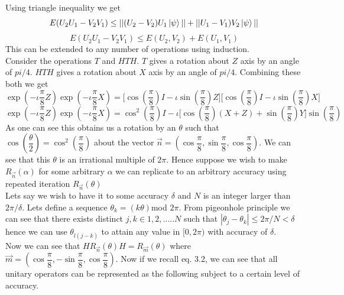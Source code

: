 \documentclass{report}
\begin{document}
Using triangle inequality we get
\begin{equation}E(U_{2}U_{1} - V_{2}V_{1}) \leq ||(U_{2} - V_{2})U_{1}\ket{\psi}|| + ||U_{1} - V_{1})V_{2}\ket{\psi}||\end{equation}
\begin{equation}E(U_{2}U_{1} - V_{2}V_{1}) \leq E(U_2,V_2) + E(U_1,V_1)\end{equation}
This can be extended to any number of operations using induction.\\
Consider the operations $T$ and $HTH$. $T$ gives a rotation about $Z$ axis by an angle of $pi/4$. $HTH$ gives a rotation about $X$ axis by an angle of $pi/4$. Combining these both we get
\begin{equation}
\exp(-\iota\dfrac{\pi}{8}Z)\exp(-\iota\dfrac{\pi}{8}X) = \Big[\cos\left(\dfrac{\pi}{8}\right)I - {\iota}\sin\left(\dfrac{\pi}{8}\right)Z\Big]\Big[\cos\left(\dfrac{\pi}{8}\right)I - {\iota}\sin\left(\dfrac{\pi}{8}\right)X\Big]
\end{equation}
\begin{equation}
\exp(-\iota\dfrac{\pi}{8}Z)\exp(-\iota\dfrac{\pi}{8}X) = {\cos}^2\left(\dfrac{\pi}{8}\right)I - \iota\Big[\cos\left(\dfrac{\pi}{8}\right)(X + Z) + \sin\left(\dfrac{\pi}{8}\right)Y\Big]\sin\left(\dfrac{\pi}{8}\right)
\end{equation}
As one can see this obtains us a rotation by an $\theta$  such that $\cos\left(\dfrac{\theta}{2}\right) = {\cos}^2\left(\dfrac{\pi}{8}\right)$ about the vector $\vec{n} = \left(\cos\dfrac{\pi}{8},\sin\dfrac{\pi}{8},\cos\dfrac{\pi}{8}\right)$. We can see that this $\theta$ is an irrational multiple of $2\pi$. Hence suppose we wish to make $R_{\vec{n}}(\alpha)$ for some arbitrary $\alpha$ we can replicate to an arbitrary accuracy using repeated iteration $R_{\vec{n}}(\theta)$\\
Lets say we wish to have it to some accuracy $\delta$ and $N$ is an integer larger than $2\pi/\delta$. Lets define a sequence $\theta_k = (k\theta)$mod $2\pi$. From pigeonhole principle we can see that there exists distinct $j,k \in{1,2,.....N}$ such that $|\theta_j - \theta_k| \leq 2\pi/N < \delta$ hence we can use $\theta_{l(j-k)}$ to attain any value in $[0, 2\pi)$ with accuracy of $\delta$.\\
Now we can see that $HR_{\vec{n}}(\theta)H = R_{\vec{m}}(\theta)$ where $\vec{m} = \left(\cos\dfrac{\pi}{8},-\sin\dfrac{\pi}{8},\cos\dfrac{\pi}{8}\right)$. Now if we recall eq. 3.2, we can see that all unitary operators can be represented as the following subject to a certain level of accuracy.
\end{document}
